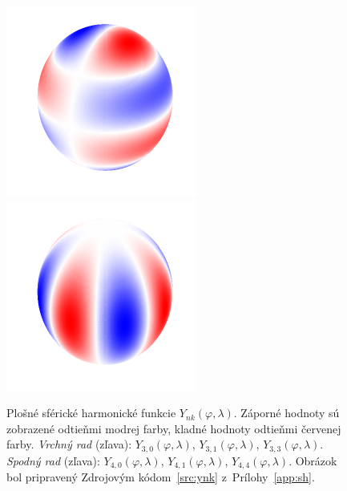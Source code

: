 \documentclass[a4paper, 12pt]{book}
\begin{document}
\begin{figure}[bt]
\includegraphics{./fig-spherical-harmonic-n4-k1.pdf}
\includegraphics{./fig-spherical-harmonic-n4-k4.pdf}
\caption{Plošné sférické harmonické funkcie $Y_{nk}(\varphi, \lambda)$.
Záporné hodnoty sú zobrazené odtieňmi modrej farby, kladné hodnoty odtieňmi
červenej farby.  \textit{Vrchný rad} (zľava): $Y_{3,0}(\varphi, \lambda)$,
$Y_{3,1}(\varphi, \lambda)$, $Y_{3,3}(\varphi, \lambda)$.  \textit{Spodný rad}
(zľava): $Y_{4,0}(\varphi, \lambda)$, $Y_{4,1}(\varphi, \lambda)$,
$Y_{4,4}(\varphi, \lambda)$.  Obrázok bol pripravený Zdrojovým
kódom~\ref{src:ynk} z~Prílohy~\ref{app:sh}.}
\label{fig:sh}
\end{figure}
\end{document}
